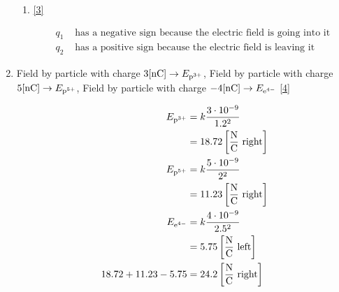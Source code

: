 \documentclass[12pt]{article}
\begin{document}
\begin{enumerate}
\begin{enumerate}
      \item \eqref{3}

        \begin{equation}
          \begin{split}
            q_1&\text{ has a negative sign because the electric field is going into it}\\
            q_2&\text{ has a positive sign because the electric field is leaving it}
          \end{split}
          \label{3}
        \end{equation}

    \end{enumerate}

    \setcounter{enumi}{56}

  \item Field by particle with charge $3[\si{\nano\coulomb}]\rightarrow E_{\ce{p^3+}}$, Field by particle with charge $5[\si{\nano\coulomb}]\rightarrow E_{\ce{p^5+}}$, Field by particle with charge $-4[\si{\nano\coulomb}]\rightarrow E_{\ce{e^4-}}$ \eqref{4}

    \begin{equation}
      \begin{split}
        E_{\ce{p^3+}}&=k\frac{3\cdot10^{-9}}{1.2^2}\\
        &=18.72\left[ \frac{\si{\newton}}{\si{\coulomb}}\text{ right}\right]\\
        E_{\ce{p^5+}}&=k\frac{5\cdot10^{-9}}{2^2}\\
        &=11.23\left[ \frac{\si{\newton}}{\si{\coulomb}}\text{ right}\right]\\
        E_{\ce{e^4-}}&=k\frac{4\cdot10^{-9}}{2.5^2}\\
        &=5.75\left[ \frac{\si{\newton}}{\si{\coulomb}}\text{ left}\right]\\
        18.72+11.23-5.75&=24.2\left[ \frac{\si{\newton}}{\si{\coulomb}}\text{ right} \right]
      \end{split}
      \label{4}
    \end{equation}

\end{enumerate}
\end{document}
